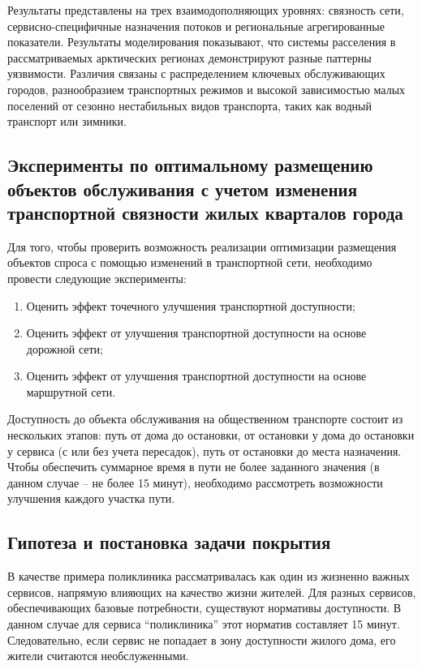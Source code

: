 \documentclass[14pt,a4paper]{extarticle}
\begin{document}
Результаты представлены на трех взаимодополняющих уровнях: связность сети, сервисно-специфичные назначения потоков и региональные агрегированные показатели. Результаты моделирования показывают, что системы расселения в рассматриваемых арктических регионах демонстрируют разные паттерны уязвимости. Различия связаны с распределением ключевых обслуживающих городов, разнообразием транспортных режимов и высокой зависимостью малых поселений от сезонно нестабильных видов транспорта, таких как водный транспорт или зимники.

\subsection*{Эксперименты по оптимальному размещению объектов обслуживания с учетом изменения транспортной связности жилых кварталов города}

Для того, чтобы проверить возможность реализации оптимизации размещения объектов спроса с помощью изменений в транспортной сети, необходимо провести следующие эксперименты:
\begin{enumerate}
    \item Оценить эффект точечного улучшения транспортной доступности;
    \item Оценить эффект от улучшения транспортной доступности на основе дорожной сети;
    \item Оценить эффект от улучшения транспортной доступности на основе маршрутной сети.
\end{enumerate}

Доступность до объекта обслуживания на общественном транспорте состоит из нескольких этапов: путь от дома до остановки, от остановки у дома до остановки у сервиса (с или без учета пересадок), путь от остановки до места назначения. Чтобы обеспечить суммарное время в пути не более заданного значения (в данном случае -- не более 15 минут), необходимо рассмотреть возможности улучшения каждого участка пути.

\subsection*{Гипотеза и постановка задачи покрытия}

В качестве примера поликлиника рассматривалась как один из жизненно важных сервисов, напрямую влияющих на качество жизни жителей. Для разных сервисов, обеспечивающих базовые потребности, существуют нормативы доступности. В данном случае для сервиса ``поликлиника'' этот норматив составляет 15 минут. Следовательно, если сервис не попадает в зону доступности жилого дома, его жители считаются необслуженными.
\end{document}
